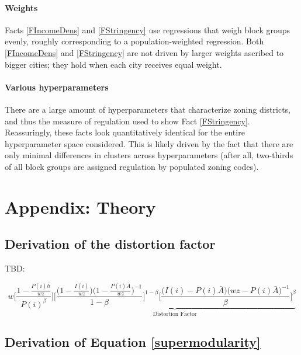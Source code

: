 \documentclass[12pt]{article}
\begin{document}
	\paragraph*{Weights} Facts \ref{FIncomeDens} and \ref{FStringency} use regressions that weigh block groups evenly, roughly corresponding to a population-weighted regression. Both \ref{FIncomeDens} and \ref{FStringency} are not driven by larger weights ascribed to bigger cities; they hold when each city receives equal weight. 
	
	\paragraph*{Various hyperparameters} There are a large amount of hyperparameters that characterize zoning districts, and thus the measure of regulation used to show Fact \ref{FStringency}. Reassuringly, these facts look quantitatively identical for the entire hyperparameter space considered. This is likely driven by the fact that there are only minimal differences in clusters across hyperparameters (after all, two-thirds of all block groups are assigned regulation by populated zoning codes). 
	
	
	
	\clearpage 
	\section{Appendix: Theory}\label{TheoryAppendix}
	
	\subsection{Derivation of the distortion factor}\label{derive_distortion}
	TBD:
	
	\begin{equation*}
		w\bigg[\frac{1-\frac{P(i)\bar{h}}{wz}}{P(i)^{\beta}}\bigg] \underbrace{\bigg[\frac{\big(1 - \frac{I(i)}{wz}\big)\big(1 - \frac{P(i)\bar{A}}{wz}\big)^{-1}}{1-\beta}\bigg]^{1-\beta}\bigg[\frac{\big(I(i) - P(i)\bar{A}\big)\big(wz - P(i)\bar{A}\big)^{-1}}{\beta}\bigg]^{\beta}}_{\text{Distortion Factor}}
	\end{equation*}

	\clearpage
	\subsection{Derivation of Equation \eqref{supermodularity}}\label{derive_supermodularity}
	
	\paragraph*{}
	
\end{document}
